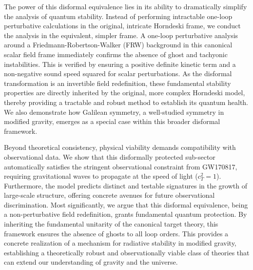 \documentclass[twocolumn]{aastex631}
\begin{document}
The power of this disformal equivalence lies in its ability to dramatically simplify the analysis of quantum stability. Instead of performing intractable one-loop perturbative calculations in the original, intricate Horndeski frame, we conduct the analysis in the equivalent, simpler frame. A one-loop perturbative analysis around a Friedmann-Robertson-Walker (FRW) background in this canonical scalar field frame immediately confirms the absence of ghost and tachyonic instabilities. This is verified by ensuring a positive definite kinetic term and a non-negative sound speed squared for scalar perturbations. As the disformal transformation is an invertible field redefinition, these fundamental stability properties are directly inherited by the original, more complex Horndeski model, thereby providing a tractable and robust method to establish its quantum health. We also demonstrate how Galilean symmetry, a well-studied symmetry in modified gravity, emerges as a special case within this broader disformal framework.

Beyond theoretical consistency, physical viability demands compatibility with observational data. We show that this disformally protected sub-sector automatically satisfies the stringent observational constraint from GW170817, requiring gravitational waves to propagate at the speed of light ($c_T^2=1$). Furthermore, the model predicts distinct and testable signatures in the growth of large-scale structure, offering concrete avenues for future observational discrimination. Most significantly, we argue that this disformal equivalence, being a non-perturbative field redefinition, grants fundamental quantum protection. By inheriting the fundamental unitarity of the canonical target theory, this framework ensures the absence of ghosts to all loop orders. This provides a concrete realization of a mechanism for radiative stability in modified gravity, establishing a theoretically robust and observationally viable class of theories that can extend our understanding of gravity and the universe.
\end{document}
